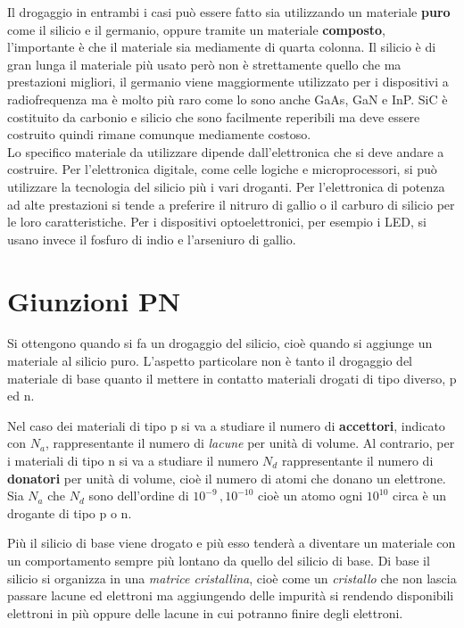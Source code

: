 \documentclass[12pt, a4paper]{report}
\begin{document}
Il drogaggio in entrambi i casi può essere fatto sia utilizzando un materiale \textbf{puro} come il silicio e il germanio, oppure tramite un materiale \textbf{composto}, l'importante è che il materiale sia mediamente di quarta colonna. Il silicio è di gran lunga il materiale più usato però non è strettamente quello che ma prestazioni migliori, il germanio viene maggiormente utilizzato per i dispositivi a radiofrequenza ma è molto più raro come lo sono anche GaAs, GaN e InP. SiC è costituito da carbonio e silicio che sono facilmente reperibili ma deve essere costruito quindi rimane comunque mediamente costoso.\\Lo specifico materiale da utilizzare dipende dall'elettronica che si deve andare a costruire. Per l'elettronica digitale, come celle logiche e microprocessori, si può utilizzare la tecnologia del silicio più i vari droganti. Per l'elettronica di potenza ad alte prestazioni si tende a preferire il nitruro di gallio o il carburo di silicio per le loro caratteristiche. Per i dispositivi optoelettronici, per esempio i LED, si usano invece il fosfuro di indio e l'arseniuro di gallio.

\section{Giunzioni PN}
Si ottengono quando si fa un drogaggio del silicio, cioè quando si aggiunge un materiale al silicio puro. L'aspetto particolare non è tanto il drogaggio del materiale di base quanto il mettere in contatto materiali drogati di tipo diverso, p ed n.

Nel caso dei materiali di tipo p si va a studiare il numero di \textbf{accettori}, indicato con $N_{a}$, rappresentante il numero di \textit{lacune} per unità di volume. Al contrario, per i materiali di tipo n si va a studiare il numero $N_{d}$ rappresentante il numero di \textbf{donatori} per unità di volume, cioè il numero di atomi che donano un elettrone. Sia $N_{a}$ che $N_{d}$ sono dell'ordine di $10^{-9}\,, 10^{-10}$ cioè un atomo ogni $10^{10}$ circa è un drogante di tipo p o n.

Più il silicio di base viene drogato e più esso tenderà a diventare un materiale con un comportamento sempre più lontano da quello del silicio di base. Di base il silicio si organizza in una \textit{matrice cristallina}, cioè come un \textit{cristallo} che non lascia passare lacune ed elettroni ma aggiungendo delle impurità si rendendo disponibili elettroni in più oppure delle lacune in cui potranno finire degli elettroni.
\end{document}

